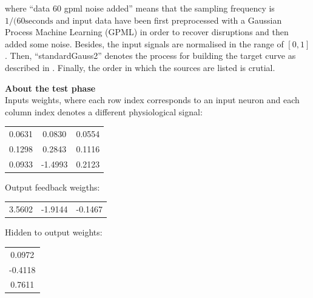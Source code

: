 \begin{description}
{where ``data 60 gpml noise  added'' means that the sampling frequency is $1/(60 \text{seconds}$ and input data have been first preprocessed with a Gaussian Process Machine Learning (GPML) in order to recover disruptions \cite{Rasmussen06gaussianprocesses} and then added some noise.
Besides, the input signals are normalised in the range of $[0,1]$. Then, ``standardGauss2'' denotes the process for building the target curve as described in . Finally, the order in which the sources are listed is crutial. 
}

\item {\textbf{About the test phase}\hfill \\
Inputs weights, where each row index corresponds to an input neuron and each column index denotes a different physiological signal:\\
\begin{center}
\begin{tabular}{ c c c }
    0.0631   & 0.0830   & 0.0554 \\
    0.1298   & 0.2843   & 0.1116 \\
    0.0933   &-1.4993   & 0.2123
\end{tabular}
\end{center}

Output feedback weigths:
\begin{center}
\begin{tabular}{ c c c }
	3.5602  & -1.9144   &-0.1467
\end{tabular}
\end{center}
}

Hidden to output weights:
\begin{center}
\begin{tabular}{ c }
0.0972\\
   -0.4118\\
    0.7611
    \end{tabular}
\end{center}

\end{description}

